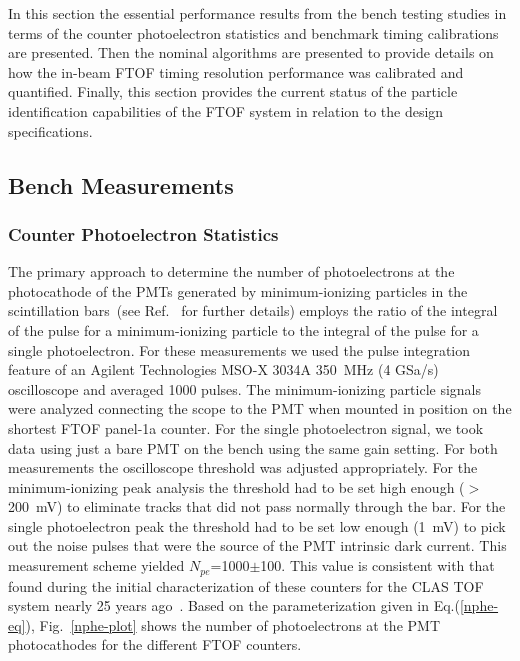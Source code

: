 \documentclass{elsart}
\begin{document}
In this section the essential performance results from the bench testing studies in terms of the counter
photoelectron statistics and benchmark timing calibrations are presented. Then the nominal algorithms
are presented to provide details on how the in-beam FTOF timing resolution performance was calibrated
and quantified. Finally, this section provides the current status of the particle identification capabilities
of the FTOF system in relation to the design specifications.

\subsection{Bench Measurements}

\subsubsection{Counter Photoelectron Statistics}
\label{sec:npe}

The primary approach to determine the number of photoelectrons at the photocathode of the PMTs
generated by minimum-ionizing particles in the scintillation bars~(see Ref.~\cite{Gi86} for further details)
employs the ratio of the integral of the pulse for a minimum-ionizing particle to the integral of the pulse for a
single photoelectron. For these measurements we used the pulse integration feature of an Agilent
Technologies MSO-X 3034A 350~MHz (4 GSa/s) oscilloscope and averaged 1000 pulses. The
minimum-ionizing particle signals were analyzed connecting the scope to the PMT when mounted in position
on the shortest FTOF panel-1a counter. For the single photoelectron signal, we took data using just a bare PMT
on the bench using the same gain setting. For both measurements the oscilloscope threshold was adjusted
appropriately. For the minimum-ionizing peak analysis the threshold had to be set high enough ($>$200~mV)
to eliminate tracks that did not pass normally through the bar. For the single photoelectron peak the 
threshold had to be set low enough (1~mV) to pick out the noise pulses that were the source of the PMT
intrinsic dark current. This measurement scheme yielded $N_{pe}$=1000$\pm$100. This value is consistent
with that found during the initial characterization of these counters for the CLAS TOF system nearly
25 years ago~\cite{tof-nim}. Based on the parameterization given in Eq.(\ref{nphe-eq}), Fig.~\ref{nphe-plot}
shows the number of photoelectrons at the PMT photocathodes for the different FTOF counters.
\end{document}
